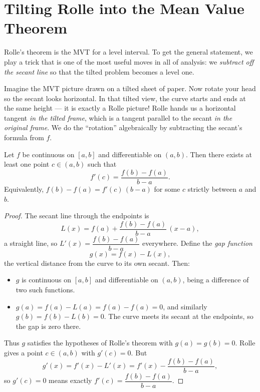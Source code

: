 \section{Tilting Rolle into the Mean Value Theorem}

Rolle's theorem is the MVT for a level interval. To get the general statement, we
play a trick that is one of the most useful moves in all of analysis: we
\emph{subtract off the secant line} so that the tilted problem becomes a level one.

\begin{intuitionbox}
Imagine the MVT picture drawn on a tilted sheet of paper. Now rotate your head so
the secant looks horizontal. In that tilted view, the curve starts and ends at the
same height --- it is exactly a Rolle picture! Rolle hands us a horizontal tangent
\emph{in the tilted frame}, which is a tangent parallel to the secant \emph{in the
original frame}. We do the ``rotation'' algebraically by subtracting the secant's
formula from $f$.
\end{intuitionbox}

\begin{theorem}\label{ch15:thm-mvt}
Let $f$ be continuous on $[a,b]$ and differentiable on $(a,b)$. Then there exists at
least one point $c\in(a,b)$ such that
\[
  f'(c)=\frac{f(b)-f(a)}{b-a}.
\]
Equivalently, $f(b)-f(a)=f'(c)\,(b-a)$ for some $c$ strictly between $a$ and $b$.
\end{theorem}

\begin{proof}
The secant line through the endpoints is
\[
  L(x)=f(a)+\frac{f(b)-f(a)}{b-a}\,(x-a),
\]
a straight line, so $L'(x)=\dfrac{f(b)-f(a)}{b-a}$ everywhere. Define the
\emph{gap function}
\[
  g(x)=f(x)-L(x),
\]
the vertical distance from the curve to its own secant. Then:
\begin{itemize}
\item $g$ is continuous on $[a,b]$ and differentiable on $(a,b)$, being a difference
of two such functions.
\item $g(a)=f(a)-L(a)=f(a)-f(a)=0$, and similarly $g(b)=f(b)-L(b)=0$. The curve
meets its secant at the endpoints, so the gap is zero there.
\end{itemize}
Thus $g$ satisfies the hypotheses of Rolle's theorem with $g(a)=g(b)=0$. Rolle
gives a point $c\in(a,b)$ with $g'(c)=0$. But
\[
  g'(x)=f'(x)-L'(x)=f'(x)-\frac{f(b)-f(a)}{b-a},
\]
so $g'(c)=0$ means exactly $f'(c)=\dfrac{f(b)-f(a)}{b-a}$.
\end{proof}

